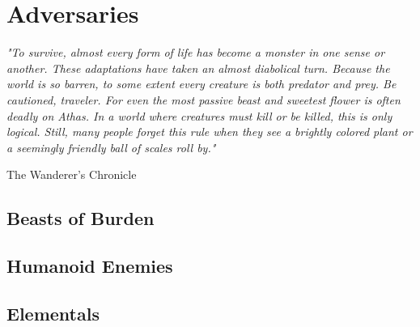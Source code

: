 \chapter{Adversaries}\label{chap:adversaries}

\epigraph{\textit{
    "To survive, almost every form of life has become a monster in one sense or another. These adaptations have taken an
    almost diabolical turn. Because the world is so barren, to some extent every creature is both predator and prey.
    Be cautioned, traveler. For even the most passive beast and sweetest flower is often deadly on Athas. In a world where
    creatures must kill or be killed, this is only logical. Still, many people forget this rule when they see a brightly
    colored plant or a seemingly friendly ball of scales roll by." } } {The Wanderer’s Chronicle}

\begin{multicols*}{2}

\section {Beasts of Burden}




\section {Humanoid Enemies}





\section {Elementals}


\end{multicols*}
